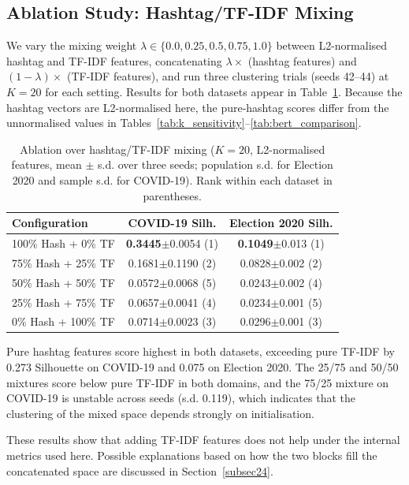 \documentclass[pdflatex,sn-mathphys-num]{sn-jnl}%
\begin{document}
\subsection{Ablation Study: Hashtag/TF-IDF Mixing}\label{subsec22}

We vary the mixing weight $\lambda \in \{0.0, 0.25, 0.5, 0.75, 1.0\}$ between L2-normalised hashtag and TF-IDF features, concatenating $\lambda \times$ (hashtag features) and $(1-\lambda) \times$ (TF-IDF features), and run three clustering trials (seeds 42--44) at $K=20$ for each setting. Results for both datasets appear in Table~\ref{tab:ablation}. Because the hashtag vectors are L2-normalised here, the pure-hashtag scores differ from the unnormalised values in Tables~\ref{tab:k_sensitivity}--\ref{tab:bert_comparison}.

\begin{table}[t]
\centering
\caption{Ablation over hashtag/TF-IDF mixing ($K=20$, L2-normalised features, mean $\pm$ s.d. over three seeds; population s.d. for Election 2020 and sample s.d. for COVID-19). Rank within each dataset in parentheses.}
\label{tab:ablation}
\begin{tabular}{lcc}
\toprule
Configuration & COVID-19 Silh. & Election 2020 Silh. \\
\midrule
100\% Hash + 0\% TF  & \textbf{0.3445}$\pm$0.0054 (1) & \textbf{0.1049}$\pm$0.013 (1) \\
75\% Hash + 25\% TF  & 0.1681$\pm$0.1190 (2) & 0.0828$\pm$0.002 (2) \\
50\% Hash + 50\% TF  & 0.0572$\pm$0.0068 (5) & 0.0243$\pm$0.002 (4) \\
25\% Hash + 75\% TF  & 0.0657$\pm$0.0041 (4) & 0.0234$\pm$0.001 (5) \\
0\% Hash + 100\% TF  & 0.0714$\pm$0.0023 (3) & 0.0296$\pm$0.001 (3) \\
\bottomrule
\end{tabular}
\end{table}

Pure hashtag features score highest in both datasets, exceeding pure TF-IDF by 0.273 Silhouette on COVID-19 and 0.075 on Election 2020. The 25/75 and 50/50 mixtures score below pure TF-IDF in both domains, and the 75/25 mixture on COVID-19 is unstable across seeds (s.d. 0.119), which indicates that the clustering of the mixed space depends strongly on initialisation.

These results show that adding TF-IDF features does not help under the internal metrics used here. Possible explanations based on how the two blocks fill the concatenated space are discussed in Section~\ref{subsec24}.
\end{document}
